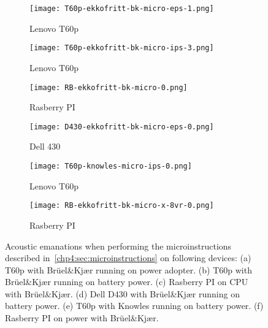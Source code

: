 \begin{figure}[ht]
    \centering
    \begin{subfigure}{0.32\textwidth}
        \centering
        \texttt{[image: T60p-ekkofritt-bk-micro-eps-1.png]}
        \caption{Lenovo T60p}
        \label{fig:comparison_T60p-ekkofritt-bk-micro-eps-1}
    \end{subfigure}
    \begin{subfigure}{0.32\textwidth}
        \centering
        \texttt{[image: T60p-ekkofritt-bk-micro-ips-3.png]}
        \caption{Lenovo T60p}
        \label{fig:comparison_T60p-ekkofritt-bk-micro-ips-3}
    \end{subfigure}
    \begin{subfigure}{0.32\textwidth}
        \centering
        \texttt{[image: RB-ekkofritt-bk-micro-0.png]}
        \caption{Rasberry PI}
        \label{fig:comparison_RB-ekkofritt-bk-micro-0}
    \end{subfigure}
    \begin{subfigure}{0.32\textwidth}
        \centering
        \texttt{[image: D430-ekkofritt-bk-micro-eps-0.png]}
        \caption{Dell 430}
        \label{fig:comparison_D430-ekkofritt-bk-micro-eps-0}
    \end{subfigure}
    \begin{subfigure}{0.32\textwidth}
        \centering
        \texttt{[image: T60p-knowles-micro-ips-0.png]}
        \caption{Lenovo T60p}
        \label{fig:comparison_T60p-knowles-micro-ips-0}
    \end{subfigure}
    \begin{subfigure}{0.32\textwidth}
        \centering
        \texttt{[image: RB-ekkofritt-bk-micro-x-8vr-0.png]}
        \caption{Rasberry PI}
        \label{fig:comparison_RB-ekkofritt-bk-micro-x-8vr-0}
    \end{subfigure}
    \caption{ Acoustic emanations when performing the microinstructions described in~\autoref{chp4:sec:microinstructions} on following devices:
    (a) T60p with Brüel\&Kjær running on power adopter.
    (b) T60p with Brüel\&Kjær running on battery power.
    (c) Rasberry PI on CPU with Brüel\&Kjær.
    (d) Dell D430 with Brüel\&Kjær running on battery power.
    (e) T60p with Knowles running on battery power.
    (f) Rasberry PI on power with Brüel\&Kjær.}
    \label{fig:comparison_micorinstructions}
\end{figure}
